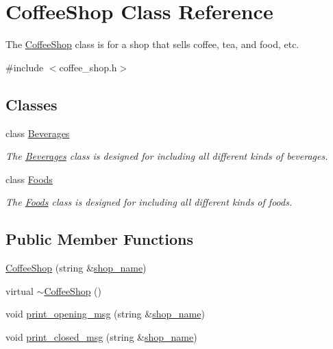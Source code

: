 \hypertarget{classCoffeeShop}{}\section{Coffee\+Shop Class Reference}
\label{classCoffeeShop}


The \hyperlink{classCoffeeShop}{Coffee\+Shop} class is for a shop that sells coffee, tea, and food, etc.  




{\ttfamily \#include $<$coffee\+\_\+shop.\+h$>$}

\subsection*{Classes}
\begin{DoxyCompactItemize}
\item 
class \hyperlink{classCoffeeShop_1_1Beverages}{Beverages}
\begin{DoxyCompactList}\small\item\em The \hyperlink{classCoffeeShop_1_1Beverages}{Beverages} class is designed for including all different kinds of beverages. \end{DoxyCompactList}\item 
class \hyperlink{classCoffeeShop_1_1Foods}{Foods}
\begin{DoxyCompactList}\small\item\em The \hyperlink{classCoffeeShop_1_1Foods}{Foods} class is designed for including all different kinds of foods. \end{DoxyCompactList}\end{DoxyCompactItemize}
\subsection*{Public Member Functions}
\begin{DoxyCompactItemize}
\item 
\hyperlink{classCoffeeShop_a017c047d9f3fd3395e72a58105acd32b}{Coffee\+Shop} (string \&\hyperlink{classCoffeeShop_ad6efd0c2040c9fd470e2e837b27547e4}{shop\+\_\+name})
\item 
virtual \hyperlink{classCoffeeShop_a7ef2b143bc94d1a65b656d43affaff90}{$\sim$\+Coffee\+Shop} ()
\item 
void \hyperlink{classCoffeeShop_a608385ea580654a679fd94dbf906d569}{print\+\_\+opening\+\_\+msg} (string \&\hyperlink{classCoffeeShop_ad6efd0c2040c9fd470e2e837b27547e4}{shop\+\_\+name})
\item 
void \hyperlink{classCoffeeShop_a4ef0961e1d6a6184e7c1ebc44932d874}{print\+\_\+closed\+\_\+msg} (string \&\hyperlink{classCoffeeShop_ad6efd0c2040c9fd470e2e837b27547e4}{shop\+\_\+name})
\end{DoxyCompactItemize}
